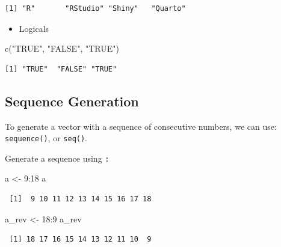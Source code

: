 \documentclass[
  letterpaper,
  DIV=11,
  numbers=noendperiod]{scrreprt}
\newenvironment{Shaded}{\begin{snugshade}}{\end{snugshade}}
\newcommand{\DecValTok}[1]{\textcolor[rgb]{0.68,0.00,0.00}{#1}}
\newcommand{\FunctionTok}[1]{\textcolor[rgb]{0.28,0.35,0.67}{#1}}
\newcommand{\NormalTok}[1]{\textcolor[rgb]{0.00,0.23,0.31}{#1}}
\newcommand{\OtherTok}[1]{\textcolor[rgb]{0.00,0.23,0.31}{#1}}
\newcommand{\SpecialCharTok}[1]{\textcolor[rgb]{0.37,0.37,0.37}{#1}}
\newcommand{\StringTok}[1]{\textcolor[rgb]{0.13,0.47,0.30}{#1}}
\providecommand{\tightlist}{%
  \setlength{\itemsep}{0pt}\setlength{\parskip}{0pt}}\usepackage{longtable,booktabs,array}
\begin{document}
\begin{verbatim}
[1] "R"       "RStudio" "Shiny"   "Quarto" 
\end{verbatim}

\begin{itemize}
\tightlist
\item
  Logicals
\end{itemize}

\begin{Shaded}
\begin{Highlighting}[]
\FunctionTok{c}\NormalTok{(}\StringTok{"TRUE"}\NormalTok{, }\StringTok{"FALSE"}\NormalTok{, }\StringTok{"TRUE"}\NormalTok{)}
\end{Highlighting}
\end{Shaded}

\begin{verbatim}
[1] "TRUE"  "FALSE" "TRUE" 
\end{verbatim}

\subsection{Sequence Generation}\label{sequence-generation}

To generate a vector with a sequence of consecutive numbers, we can use:
\texttt{sequence()}, or \texttt{seq()}.

Generate a sequence using \texttt{:}

\begin{Shaded}
\begin{Highlighting}[]
\NormalTok{a }\OtherTok{\textless{}{-}} \DecValTok{9}\SpecialCharTok{:}\DecValTok{18}
\NormalTok{a}
\end{Highlighting}
\end{Shaded}

\begin{verbatim}
 [1]  9 10 11 12 13 14 15 16 17 18
\end{verbatim}

\begin{Shaded}
\begin{Highlighting}[]
\NormalTok{a\_rev }\OtherTok{\textless{}{-}} \DecValTok{18}\SpecialCharTok{:}\DecValTok{9}
\NormalTok{a\_rev}
\end{Highlighting}
\end{Shaded}

\begin{verbatim}
 [1] 18 17 16 15 14 13 12 11 10  9
\end{verbatim}
\end{document}
